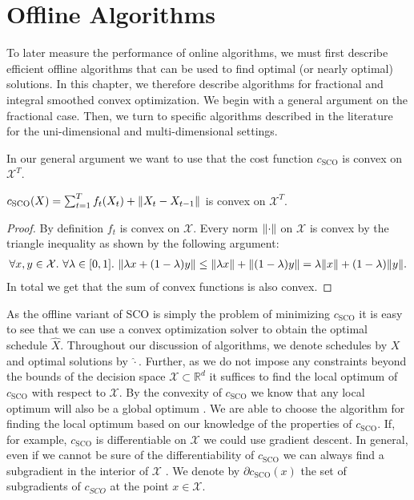 
\chapter{Offline Algorithms}\label{chapter:offline_algorithms}

To later measure the performance of online algorithms, we must first describe efficient offline algorithms that can be used to find optimal (or nearly optimal) solutions. In this chapter, we therefore describe algorithms for fractional and integral smoothed convex optimization. We begin with a general argument on the fractional case. Then, we turn to specific algorithms described in the literature for the uni-dimensional and multi-dimensional settings.

In our general argument we want to use that the cost function $c_{\text{SCO}}$ is convex on $\mathcal{X}^T$.

\begin{lemma}
$c_{\text{SCO}}(X) = \sum_{t=1}^T f_t(X_t) + \lVert X_t - X_{t-1}\rVert$ is convex on $\mathcal{X}^T$.
\end{lemma}
\begin{proof}
By definition $f_t$ is convex on $\mathcal{X}$. Every norm $\lVert\cdot\rVert$ on $\mathcal{X}$ is convex by the triangle inequality as shown by the following argument: \begin{align*}
    \forall x, y \in \mathcal{X}.\ \forall \lambda \in [0,1].\ \norm{\lambda x + (1 - \lambda) y} \leq \norm{\lambda x} + \norm{(1 - \lambda) y} = \lambda \norm{x} + (1 - \lambda) \norm{y}.
\end{align*} In total we get that the sum of convex functions is also convex.
\end{proof}

As the offline variant of SCO is simply the problem of minimizing $c_{\text{SCO}}$ it is easy to see that we can use a convex optimization solver to obtain the optimal schedule $\hat{X}$. Throughout our discussion of algorithms, we denote schedules by $X$ and optimal solutions by $\hat{\cdot}$. Further, as we do not impose any constraints beyond the bounds of the decision space $\mathcal{X} \subset \mathbb{R}^d$ it suffices to find the local optimum of $c_{\text{SCO}}$ with respect to $\mathcal{X}$. By the convexity of $c_{\text{SCO}}$ we know that any local optimum will also be a global optimum \cite{Bubeck2015}. We are able to choose the algorithm for finding the local optimum based on our knowledge of the properties of $c_{\text{SCO}}$. If, for example, $c_{\text{SCO}}$ is differentiable on $\mathcal{X}$ we could use gradient descent. In general, even if we cannot be sure of the differentiability of $c_{\text{SCO}}$ we can always find a subgradient in the interior of $\mathcal{X}$ \cite{Bubeck2015}. We denote by $\partial c_{\text{SCO}}(x)$ the set of subgradients of $c_{SCO}$ at the point $x \in \mathcal{X}$.

